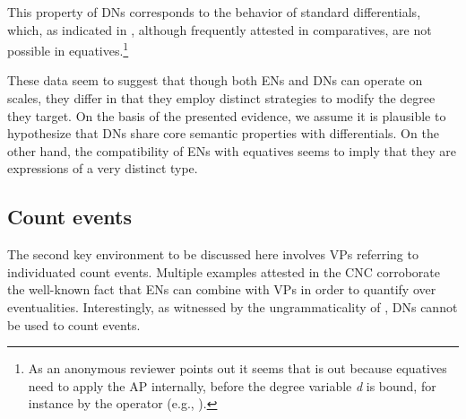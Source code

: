 \documentclass[output=paper,modfonts,hidelinks,newtxmath
\ChapterDOI{10.5281/zenodo.2545513}
]{langscibook}
\begin{document}
\ea {}
\z \z

\noindent This property of DNs corresponds to the behavior of standard differentials, which, as indicated in , although frequently attested in comparatives, are not possible in equatives.\footnote{As an anonymous reviewer points out it seems that  is out because equatives need to apply the AP internally, before the degree variable \textit{d} is bound, for instance by the  operator (e.g., \citealt{kennedy_mcnally2005scale}).}

\ea \label{diff} 
\z \z

\noindent These data seem to suggest that though both ENs and DNs can operate on scales, they differ in that they employ distinct strategies to modify the degree they target. On the basis of the presented evidence, we assume it is plausible to hypothesize that DNs share core semantic properties with differentials. On the other hand, the compatibility of ENs with equatives seems to imply that they are expressions of a very distinct type.

\subsection{Count events}\label{count-events}

The second key environment to be discussed here involves VPs referring to individuated count events. Multiple examples attested in the CNC corroborate the well-known fact that ENs can combine with VPs in order to quantify over eventualities. Interestingly, as witnessed by the ungrammaticality of , DNs cannot be used to count events.
\end{document}
